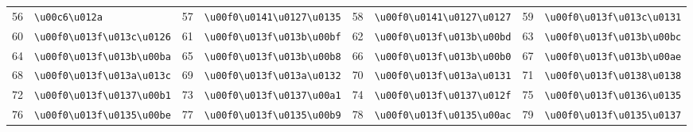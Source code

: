 \begin{table}[!htbp]
\begin{tabular}{r l r l r l r l}
56 & \texttt{\textbackslash{}u00c6\textbackslash{}u012a} & 57 & \texttt{\textbackslash{}u00f0\textbackslash{}u0141\textbackslash{}u0127\textbackslash{}u0135} & 58 & \texttt{\textbackslash{}u00f0\textbackslash{}u0141\textbackslash{}u0127\textbackslash{}u0127} & 59 & \texttt{\textbackslash{}u00f0\textbackslash{}u013f\textbackslash{}u013c\textbackslash{}u0131} \\
60 & \texttt{\textbackslash{}u00f0\textbackslash{}u013f\textbackslash{}u013c\textbackslash{}u0126} & 61 & \texttt{\textbackslash{}u00f0\textbackslash{}u013f\textbackslash{}u013b\textbackslash{}u00bf} & 62 & \texttt{\textbackslash{}u00f0\textbackslash{}u013f\textbackslash{}u013b\textbackslash{}u00bd} & 63 & \texttt{\textbackslash{}u00f0\textbackslash{}u013f\textbackslash{}u013b\textbackslash{}u00bc} \\
64 & \texttt{\textbackslash{}u00f0\textbackslash{}u013f\textbackslash{}u013b\textbackslash{}u00ba} & 65 & \texttt{\textbackslash{}u00f0\textbackslash{}u013f\textbackslash{}u013b\textbackslash{}u00b8} & 66 & \texttt{\textbackslash{}u00f0\textbackslash{}u013f\textbackslash{}u013b\textbackslash{}u00b0} & 67 & \texttt{\textbackslash{}u00f0\textbackslash{}u013f\textbackslash{}u013b\textbackslash{}u00ae} \\
68 & \texttt{\textbackslash{}u00f0\textbackslash{}u013f\textbackslash{}u013a\textbackslash{}u013c} & 69 & \texttt{\textbackslash{}u00f0\textbackslash{}u013f\textbackslash{}u013a\textbackslash{}u0132} & 70 & \texttt{\textbackslash{}u00f0\textbackslash{}u013f\textbackslash{}u013a\textbackslash{}u0131} & 71 & \texttt{\textbackslash{}u00f0\textbackslash{}u013f\textbackslash{}u0138\textbackslash{}u0138} \\
72 & \texttt{\textbackslash{}u00f0\textbackslash{}u013f\textbackslash{}u0137\textbackslash{}u00b1} & 73 & \texttt{\textbackslash{}u00f0\textbackslash{}u013f\textbackslash{}u0137\textbackslash{}u00a1} & 74 & \texttt{\textbackslash{}u00f0\textbackslash{}u013f\textbackslash{}u0137\textbackslash{}u012f} & 75 & \texttt{\textbackslash{}u00f0\textbackslash{}u013f\textbackslash{}u0136\textbackslash{}u0135} \\
76 & \texttt{\textbackslash{}u00f0\textbackslash{}u013f\textbackslash{}u0135\textbackslash{}u00be} & 77 & \texttt{\textbackslash{}u00f0\textbackslash{}u013f\textbackslash{}u0135\textbackslash{}u00b9} & 78 & \texttt{\textbackslash{}u00f0\textbackslash{}u013f\textbackslash{}u0135\textbackslash{}u00ac} & 79 & \texttt{\textbackslash{}u00f0\textbackslash{}u013f\textbackslash{}u0135\textbackslash{}u0137} \\

\end{tabular}
\end{table}
